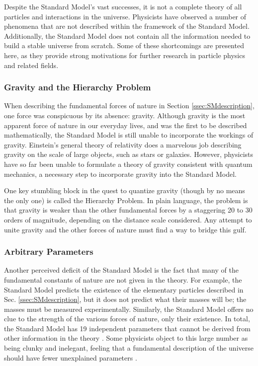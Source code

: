 Despite the Standard Model's vast successes, it is not a complete
theory of all particles and interactions in the universe. Physicists
have observed a number of phenomena that are not described within the
framework of the Standard Model. Additionally, the Standard Model does
not contain all the information needed to build a stable universe from
scratch. Some of these shortcomings are presented here, as they provide
strong motivations for further research in particle physics and
related fields.

\subsubsection*{Gravity and the Hierarchy Problem}
When describing the fundamental forces of nature in Section
\ref{ssec:SMdescription}, one force was conspicuous by its absence:
gravity. Although gravity is the most apparent force of nature in our
everyday lives, and was the first to be described mathematically,
the Standard Model is still unable to incorporate the workings of
gravity. Einstein's general theory of relativity does a marvelous job
describing gravity on the scale of large objects, such as stars or
galaxies. However, physicists have so far been unable to formulate a
theory of gravity consistent with quantum mechanics, a necessary step
to incorporate gravity into the Standard Model.

One key stumbling block in the quest to quantize gravity (though by no
means the only one) is called the Hierarchy Problem. In plain language, the
problem is that gravity is weaker than the other fundamental forces by
a staggering 20 to 30 orders of magnitude, depending on the distance
scale considered. Any attempt to unite gravity and the other forces
of nature must find a way to bridge this gulf. %

\subsubsection*{Arbitrary Parameters}
Another perceived deficit of the Standard Model is the fact that many
of the fundamental constants of nature are not given in the theory. For
example, the Standard Model predicts the existence of the elementary
particles described in Sec. \ref{ssec:SMdescription}, but it does
not predict what their masses will be;
the masses must be measured experimentally. Similarly, the Standard
Model offers no clue to the strength of the various forces of nature,
only their existence. In total, the Standard Model has 19 independent
parameters that cannot be derived from other information in the theory
\cite{smparams}. Some physicists object to this large number as being clunky
and inelegant, feeling that a fundamental description of the universe
should have fewer unexplained parameters \cite{griffiths}.

